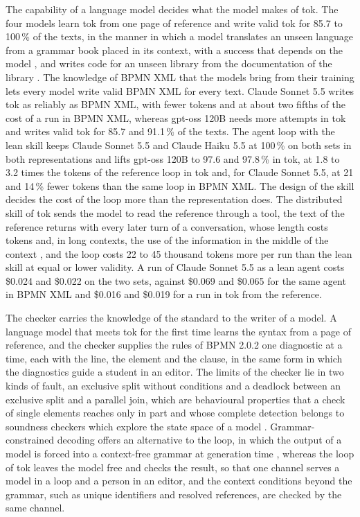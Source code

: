 \documentclass[11pt,a4paper]{article}
\begin{document}
The capability of a language model decides what the model makes of tok. The four models learn tok from one page of reference and write valid tok for 85.7 to 100\,\% of the texts, in the manner in which a model translates an unseen language from a grammar book placed in its context, with a success that depends on the model \citep{Tanzer2024benchmark}, and writes code for an unseen library from the documentation of the library \citep{Zhou2023docprompting}. The knowledge of BPMN XML that the models bring from their training lets every model write valid BPMN XML for every text. Claude Sonnet 5.5 writes tok as reliably as BPMN XML, with fewer tokens and at about two fifths of the cost of a run in BPMN XML, whereas gpt-oss 120B needs more attempts in tok and writes valid tok for 85.7 and 91.1\,\% of the texts. The agent loop with the lean skill keeps Claude Sonnet 5.5 and Claude Haiku 5.5 at 100\,\% on both sets in both representations and lifts gpt-oss 120B to 97.6 and 97.8\,\% in tok, at 1.8 to 3.2 times the tokens of the reference loop in tok and, for Claude Sonnet 5.5, at 21 and 14\,\% fewer tokens than the same loop in BPMN XML. The design of the skill decides the cost of the loop more than the representation does. The distributed skill of tok sends the model to read the reference through a tool, the text of the reference returns with every later turn of a conversation, whose length costs tokens and, in long contexts, the use of the information in the middle of the context \citep{Liu2024lost}, and the loop costs 22 to 45 thousand tokens more per run than the lean skill at equal or lower validity. A run of Claude Sonnet 5.5 as a lean agent costs \$0.024 and \$0.022 on the two sets, against \$0.069 and \$0.065 for the same agent in BPMN XML and \$0.016 and \$0.019 for a run in tok from the reference.

The checker carries the knowledge of the standard to the writer of a model. A language model that meets tok for the first time learns the syntax from a page of reference, and the checker supplies the rules of BPMN 2.0.2 one diagnostic at a time, each with the line, the element and the clause, in the same form in which the diagnostics guide a student in an editor. The limits of the checker lie in two kinds of fault, an exclusive split without conditions and a deadlock between an exclusive split and a parallel join, which are behavioural properties that a check of single elements reaches only in part and whose complete detection belongs to soundness checkers which explore the state space of a model \citep{Fahland2011analysis}. Grammar-constrained decoding offers an alternative to the loop, in which the output of a model is forced into a context-free grammar at generation time \citep{Geng2023grammar,Poesia2022synchromesh}, whereas the loop of tok leaves the model free and checks the result, so that one channel serves a model in a loop and a person in an editor, and the context conditions beyond the grammar, such as unique identifiers and resolved references, are checked by the same channel.
\end{document}
